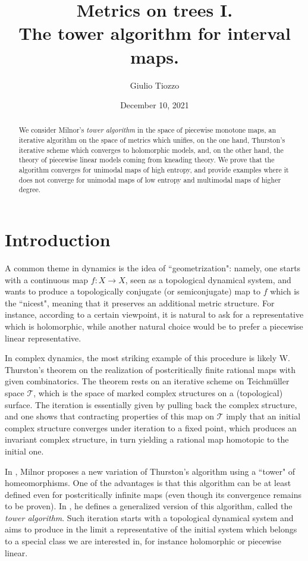 \documentclass[11pt]{amsart}
\title{Metrics on trees I. \\ The tower algorithm for interval maps.}
\author{Giulio Tiozzo}
\date{December 10, 2021}
\begin{document}
\maketitle

\begin{abstract}
We consider Milnor's \emph{tower algorithm} in the space of piecewise monotone maps, 
an iterative algorithm on the space of metrics which unifies, on the one hand, Thurston's iterative 
scheme which converges to holomorphic models, and, on the other hand, the theory of 
piecewise linear models coming from kneading theory. 
We prove that the algorithm converges for unimodal maps of high entropy, 
and provide examples where it does not converge for unimodal maps of low entropy and multimodal maps 
of higher degree. 
\end{abstract}

\section{Introduction}

A common theme in dynamics is the idea of ``geometrization": namely, one starts with a continuous map 
$f: X \to X$, seen as a topological dynamical system, and wants to produce a topologically conjugate (or semiconjugate) map to $f$ which is the ``nicest", meaning that it preserves an additional metric structure. 
For instance, according to a certain viewpoint, it is natural to ask for a representative which is holomorphic, while 
another natural choice would be to prefer a piecewise linear representative. 

In complex dynamics, the most striking example of this procedure is likely W. Thurston's theorem \cite{DH} on the realization of postcritically finite rational maps with given combinatorics. The theorem rests on an iterative scheme on Teichm\"uller space $\mathcal{T}$, which
is the space of marked complex structures on a (topological) surface.  The iteration is essentially given by pulling back the complex structure, and one shows that contracting properties of this map on $\mathcal{T}$ imply that an initial complex structure converges under iteration to a fixed point, which produces an invariant complex structure, in turn yielding a rational map homotopic to the initial one.  

In \cite{Mil}, Milnor proposes a new variation of Thurston's algorithm 
using a ``tower" of homeomorphisms. One of the advantages is that this algorithm can be 
at least defined even for postcritically infinite maps (even though its convergence remains to be proven). 
In \cite{Mil-slides}, he defines a generalized version of this algorithm, called the \emph{tower algorithm}. 
Such iteration starts with a topological dynamical system and aims to produce in the limit a
representative of the initial system which belongs to a special class we are interested in,
for instance holomorphic or piecewise linear.
\end{document}
